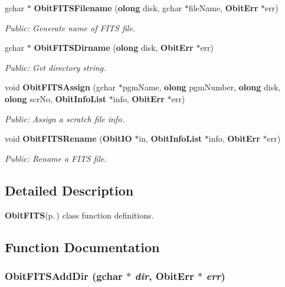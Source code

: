 \begin{CompactItemize}
gchar $\ast$ {\bf Obit\-FITSFilename} ({\bf olong} disk, gchar $\ast$file\-Name, {\bf Obit\-Err} $\ast$err)
\begin{CompactList}\small\item\em Public: Generate name of FITS file. \item\end{CompactList}\item 
gchar $\ast$ {\bf Obit\-FITSDirname} ({\bf olong} disk, {\bf Obit\-Err} $\ast$err)
\begin{CompactList}\small\item\em Public: Get directory string. \item\end{CompactList}\item 
void {\bf Obit\-FITSAssign} (gchar $\ast$pgm\-Name, {\bf olong} pgm\-Number, {\bf olong} disk, {\bf olong} scr\-No, {\bf Obit\-Info\-List} $\ast$info, {\bf Obit\-Err} $\ast$err)
\begin{CompactList}\small\item\em Public: Assign a scratch file info. \item\end{CompactList}\item 
void {\bf Obit\-FITSRename} ({\bf Obit\-IO} $\ast$in, {\bf Obit\-Info\-List} $\ast$info, {\bf Obit\-Err} $\ast$err)
\begin{CompactList}\small\item\em Public: Rename a FITS file. \item\end{CompactList}\end{CompactItemize}


\subsection{Detailed Description}
{\bf Obit\-FITS}{\rm (p.\,\pageref{structObitFITS})} class function definitions. 



\subsection{Function Documentation}
\subsubsection{ Obit\-FITSAdd\-Dir (gchar $\ast$ {\em dir}, {\bf Obit\-Err} $\ast$ {\em err})}\label{ObitFITS_8c_a4}


